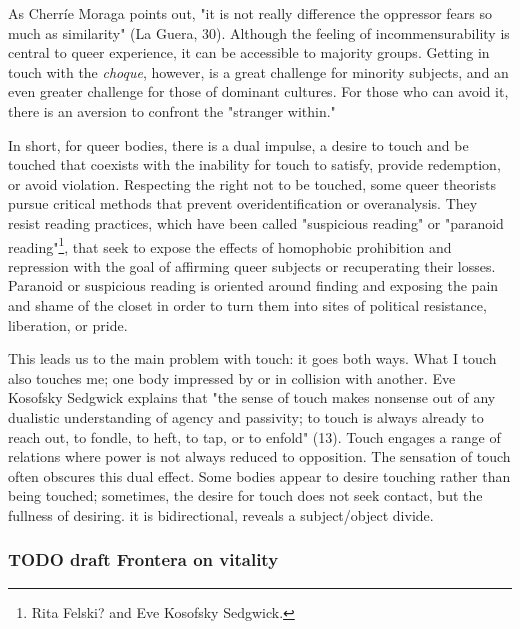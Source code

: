 \documentclass[11pt]{article}
\begin{document}
As Cherríe Moraga points out, "it is not really difference the
oppressor fears so much as similarity" (La Guera, 30). Although the
feeling of incommensurability is central to queer experience, it can
be accessible to majority groups. Getting in touch with the \emph{choque},
however, is a great challenge for minority subjects, and an even
greater challenge for those of dominant cultures. For those who can
avoid it, there is an aversion to confront the "stranger within."

In short, for queer bodies, there is a dual impulse, a desire to touch
and be touched that coexists with the inability for touch to satisfy,
provide redemption, or avoid violation. Respecting the right not to be
touched, some queer theorists pursue critical methods that prevent
overidentification or overanalysis. They resist reading practices,
which have been called "suspicious reading" or "paranoid
reading"\footnote{Rita Felski? and Eve Kosofsky Sedgwick.}, that seek to expose the effects of homophobic
prohibition and repression with the goal of affirming queer subjects
or recuperating their losses. Paranoid or suspicious reading is
oriented around finding and exposing the pain and shame of the closet
in order to turn them into sites of political resistance, liberation,
or pride.

This leads us to the main problem with touch: it goes both ways. What
I touch also touches me; one body impressed by or in collision with
another. Eve Kosofsky Sedgwick explains that "the sense of touch makes
nonsense out of any dualistic understanding of agency and passivity;
to touch is always already to reach out, to fondle, to heft, to tap,
or to enfold" (13). Touch engages a range of relations where power is
not always reduced to opposition. The sensation of touch often
obscures this dual effect. Some bodies appear to desire touching
rather than being touched; sometimes, the desire for touch does not
seek contact, but the fullness of desiring.  it is bidirectional,
reveals a subject/object divide.

\subsubsection{{\bfseries\sffamily TODO} draft Frontera on vitality}
\label{sec:org7a361a6}
\end{document}
